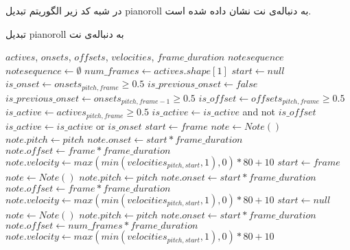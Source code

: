 در شبه کد زیر الگوریتم تبدیل \gls{pianoroll} به دنباله‌ی نت نشان داده شده است.
\begin{algorithm}
\caption{تبدیل \gls{pianoroll} به دنباله‌ی نت}
\begin{algorithmic}
\begin{latin}
    \Require $actives$, $onsets$, $offsets$, $velocities$, $frame\_duration$
    \Ensure $notesequence$
    \State $notesequence \leftarrow \emptyset$
    \State $num\_frames \leftarrow actives.shape[1]$
        \State $start \leftarrow null$
            \State $is\_onset \leftarrow onsets_{pitch, frame} \geq 0.5$
            \State $is\_previous\_onset \leftarrow false$
                \State $is\_previous\_onset \leftarrow onsets_{pitch, frame-1} \geq 0.5$
            \EndIf
            \State $is\_offset \leftarrow offsets_{pitch, frame} \geq 0.5$
            \State $is\_active \leftarrow actives_{pitch, frame} \geq 0.5$
            \State $is\_active \leftarrow is\_active$ and not $is\_offset$
            \State $is\_active \leftarrow is\_active$ or $is\_onset$
                \State $start \leftarrow frame$
                \State $note \leftarrow Note()$
                \State $note.pitch \leftarrow pitch$
                \State $note.onset \leftarrow start * frame\_duration$
                \State $note.offset \leftarrow frame * frame\_duration$
                \State $note.velocity \leftarrow max(min(velocities_{pitch, start}, 1), 0) * 80 + 10$
                \State $start \leftarrow frame$
                \State $note \leftarrow Note()$
                \State $note.pitch \leftarrow pitch$
                \State $note.onset \leftarrow start * frame\_duration$
                \State $note.offset \leftarrow frame * frame\_duration$
                \State $note.velocity \leftarrow max(min(velocities_{pitch, start}, 1), 0) * 80 + 10$
                \State $start \leftarrow null$
            \EndIf
                \State $note \leftarrow Note()$
                \State $note.pitch \leftarrow pitch$
                \State $note.onset \leftarrow start * frame\_duration$
                \State $note.offset \leftarrow num\_frames * frame\_duration$
                \State $note.velocity \leftarrow max(min(velocities_{pitch, start}, 1), 0) * 80 + 10$
            \EndIf
        \EndFor
    \EndFor
\end{latin}
\end{algorithmic}
\end{algorithm}

